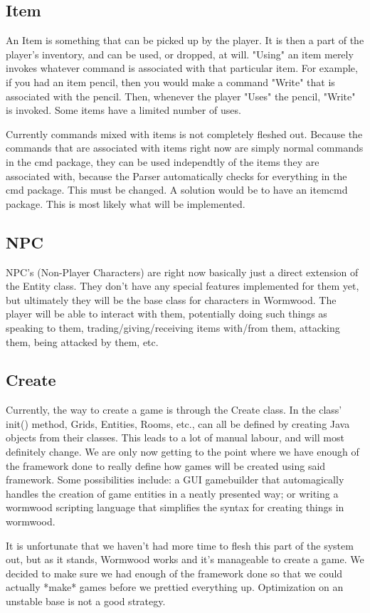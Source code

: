\documentclass[12pt]{report}
\begin{document}
\subsection{Item}
An Item is something that can be picked up by the player. It is then a part of
the player's inventory, and can be used, or dropped, at will. "Using" an item
merely invokes whatever command is associated with that particular item. For
example, if you had an item pencil, then you would make a command "Write" that
is associated with the pencil. Then, whenever the player "Uses" the pencil,
"Write" is invoked. Some items have a limited number of uses.

Currently commands mixed with items is not completely fleshed out. Because 
the commands that are associated with items right now are simply normal 
commands in the cmd package, they can be used independtly of the items they
are associated with, because the Parser automatically checks for everything
in the cmd package. This must be changed. A solution would be to have an
itemcmd package. This is most likely what will be implemented.

\subsection{NPC}
NPC's (Non-Player Characters) are right now basically just a direct extension of the Entity class.
They don't have any special features implemented for them yet, but ultimately
they will be the base class for characters in Wormwood. The player will be
able to interact with them, potentially doing such things as speaking to them,
trading/giving/receiving items with/from them, attacking them, being attacked
by them, etc.

\subsection{Create}
Currently, the way to create a game is through the Create class. In the class'
init() method, Grids, Entities, Rooms, etc., can all be defined by creating
Java objects from their classes. This leads to a lot of manual labour, and
will most definitely change. We are only now getting to the point where
we have enough of the framework done to really define how games will be 
created using said framework. Some possibilities include: a GUI
gamebuilder that automagically handles the creation of game entities in 
a neatly presented way; or writing a wormwood scripting language that simplifies
the syntax for creating things in wormwood. 

It is unfortunate that we haven't had more time to flesh this part of the 
system out, but as it stands, Wormwood works and it's manageable to create
a game. We decided to make sure we had enough of the framework done so 
that we could actually *make* games before we prettied everything up. 
Optimization on an unstable base is not a good strategy.
\end{document}
